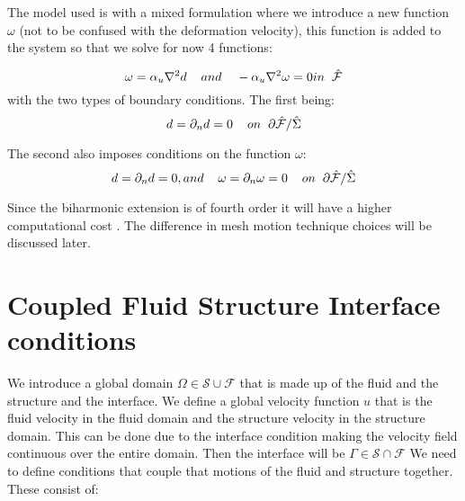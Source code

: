 The model used is with a mixed formulation where we introduce a new function $\omega$ (not to be confused with the deformation velocity), this function is added to the system so that we solve for now 4 functions:

\begin{equation}
\omega = \alpha_u \nabla^2 d \hspace{4mm} and \hspace{4mm} - \alpha_u \nabla^2 \omega = 0   in \hspace{2mm} \hat{\mathcal{F}}
\end{equation}
with the two types of boundary conditions. The first being:
\begin{equation}
d = \partial_n d = 0 \hspace{4mm} on \hspace{2mm} \partial \hat{\mathcal{F}} / \hat{\Sigma}
\end{equation}

The second also imposes conditions on the function $\omega$:	
\begin{equation}
d = \partial_n d = 0 , and \hspace{4mm}   \omega = \partial_n \omega = 0    \hspace{4mm} on \hspace{2mm} \partial \hat{\mathcal{F}} / \hat{\Sigma}
\end{equation}

Since the biharmonic extension is of fourth order it will have a higher computational cost \cite{Richter2016}. The difference in mesh motion technique choices will be discussed later.


\section{Coupled Fluid Structure Interface conditions}
We introduce a global domain $\Omega \in \mathcal{S} \cup \mathcal{F} $ that is made up of the fluid and the structure and the interface. We define a global velocity function $u$ that is the fluid velocity in the fluid domain and the structure velocity in the structure domain. This can be done due to the interface condition making the velocity field continuous over the entire domain. Then the interface will be $ \Gamma \in \mathcal{S} \cap \mathcal{F}  $  
We need to define conditions that couple that motions of the fluid and structure together. These consist of:

